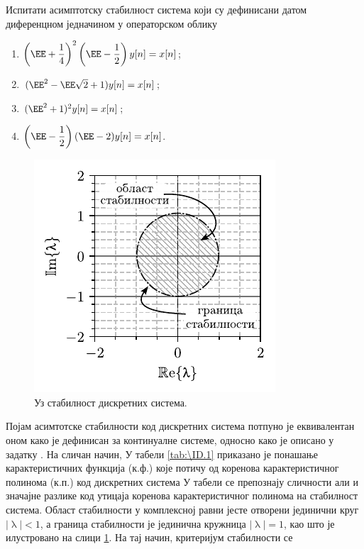 \PID \mnImportant
Испитати асимптотску стабилност система који су дефинисани датом диференцном једначином у операторском облику
\begin{multicols}{2}
    \begin{enumerate}[label=(\alph*)]
    \item $ \left(\EE + \dfrac14 \right)^2\left(\EE - \dfrac12 \right)y[n] = x[n]$;
    \item $(\EE^2 - \EE \sqrt2 + 1) y[n] = x[n]$;
    \item $(\EE^2 + 1)^2 y[n] = x[n]$;
    \item $\left(\EE - \dfrac12 \right)(\EE - 2) y[n] = x[n]$.
    \end{enumerate}
\end{multicols} \noindent

\RESENJE 
%
\begin{figure}[b!]
    \centering
    \includegraphics{fig/stab_edit.pdf}
    \caption{Уз стабилност дискретних система.}
    \label{fig:\ID.stab}
\end{figure}
%
Појам асимтотске стабилности код дискретних система потпуно је еквивалентан оном како је дефинисан 
за континуалне системе, односно како је описано у задатку . На сличан начин, 
У табели \ref{tab:\ID.1} приказано је понашање карактеристичних функција (к.ф.) које потичу од коренова карактеристичног 
полинома (к.п.) код дискретних система 
%
У табели се препознају сличности али и значајне разлике код утицаја коренова карактеристичног полинома 
на стабилност система. Област стабилности у комплексној равни јесте отворени јединични круг $|\uplambda| < 1$, 
а граница стабилности је јединична кружница $|\uplambda| = 1$, као што је илустровано на слици
\ref{fig:\ID.stab}. На тај начин, критеријум стабилности се 
